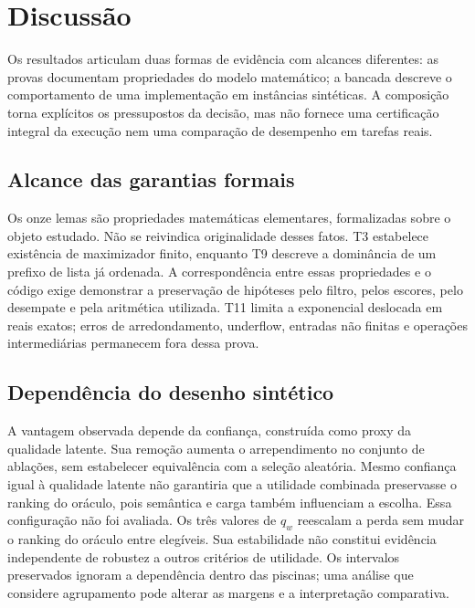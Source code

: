 \chapter{Discussão}\label{cap:discussao}
Os resultados articulam duas formas de evidência com alcances diferentes: as provas documentam propriedades do modelo matemático; a bancada descreve o comportamento de uma implementação em instâncias sintéticas. A composição torna explícitos os pressupostos da decisão, mas não fornece uma certificação integral da execução nem uma comparação de desempenho em tarefas reais.
\section{Alcance das garantias formais}
Os onze lemas são propriedades matemáticas elementares, formalizadas sobre o objeto estudado. Não se reivindica originalidade desses fatos. T3 estabelece existência de maximizador finito, enquanto T9 descreve a dominância de um prefixo de lista já ordenada. A correspondência entre essas propriedades e o código exige demonstrar a preservação de hipóteses pelo filtro, pelos escores, pelo desempate e pela aritmética utilizada. T11 limita a exponencial deslocada em reais exatos; erros de arredondamento, underflow, entradas não finitas e operações intermediárias permanecem fora dessa prova.
\section{Dependência do desenho sintético}
A vantagem observada depende da confiança, construída como proxy da qualidade latente. Sua remoção aumenta o arrependimento no conjunto de ablações, sem estabelecer equivalência com a seleção aleatória. Mesmo confiança igual à qualidade latente não garantiria que a utilidade combinada preservasse o ranking do oráculo, pois semântica e carga também influenciam a escolha. Essa configuração não foi avaliada.
Os três valores de $q_w$ reescalam a perda sem mudar o ranking do oráculo entre elegíveis. Sua estabilidade não constitui evidência independente de robustez a outros critérios de utilidade. Os intervalos preservados ignoram a dependência dentro das piscinas; uma análise que considere agrupamento pode alterar as margens e a interpretação comparativa.
